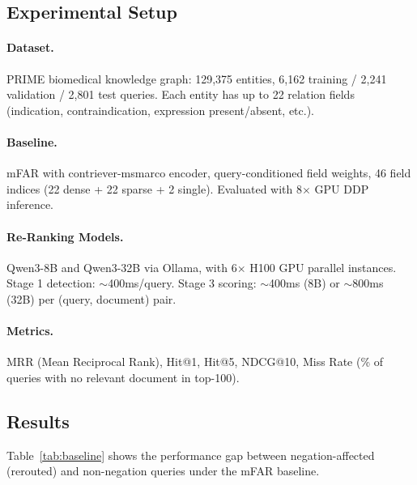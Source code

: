 \subsection{Experimental Setup}

\paragraph{Dataset.} PRIME biomedical knowledge graph: 129,375 entities, 6,162 training / 2,241 validation / 2,801 test queries. Each entity has up to 22 relation fields (indication, contraindication, expression present/absent, etc.).

\paragraph{Baseline.} mFAR with contriever-msmarco encoder, query-conditioned field weights, 46 field indices (22 dense + 22 sparse + 2 single). Evaluated with 8$\times$ GPU DDP inference.

\paragraph{Re-Ranking Models.} Qwen3-8B and Qwen3-32B via Ollama, with 6$\times$ H100 GPU parallel instances. Stage 1 detection: $\sim$400ms/query. Stage 3 scoring: $\sim$400ms (8B) or $\sim$800ms (32B) per (query, document) pair.

\paragraph{Metrics.} MRR (Mean Reciprocal Rank), Hit@1, Hit@5, NDCG@10, Miss Rate (\% of queries with no relevant document in top-100).

\subsection{Results}

Table~\ref{tab:baseline} shows the performance gap between negation-affected (rerouted) and non-negation queries under the mFAR baseline.


